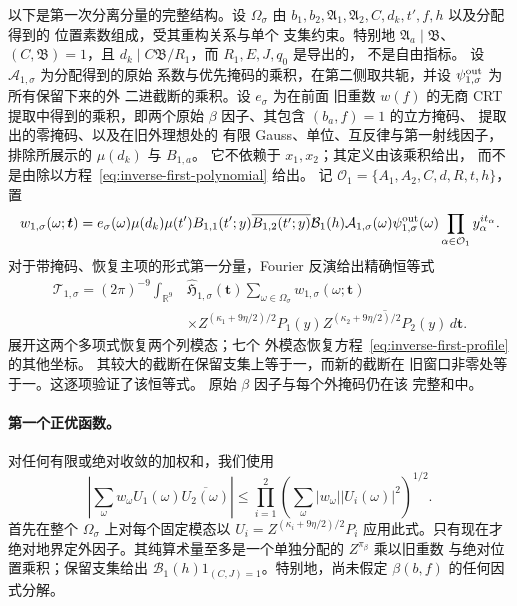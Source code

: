 以下是第一次分离分量的完整结构。设
\(\Omega_\sigma\) 由
\(b_1,b_2,\mathfrak A_1,\mathfrak A_2,C,d_k,t',f,h\) 以及分配得到的
位置素数组成，受其重构关系与单个
支集约束。特别地
\(\mathfrak A_a\mid\mathfrak B\)、\((C,\mathfrak B)=1\)，且
\(d_k\mid C\mathfrak B/R_1\)，而 \(R_1,E,J,q_0\) 是导出的，
不是自由指标。
设 \(\mathcal A_{1,\sigma}\) 为分配得到的原始
系数与优先掩码的乘积，在第二侧取共轭，并设
\(\psi_{1,\sigma}^{\rm out}\) 为所有保留下来的外
二进截断的乘积。设 \(e_\sigma\) 为在前面
旧重数 \(w(f)\) 的无商 CRT 提取中得到的乘积，即两个原始
\(\beta\) 因子、其包含 \((b_a,f)=1\) 的立方掩码、
提取出的零掩码、以及在旧外理想处的
有限 Gauss、单位、互反律与第一射线因子，排除所展示的 \(\mu(d_k)\) 与 \(B_{1,a}\)。
它不依赖于 \(x_1,x_2\)；其定义由该乘积给出，
而不是由除以方程~\eqref{eq:inverse-first-polynomial} 给出。
记 \(\mathcal O_1=\{A_1,A_2,C,d,R,t,h\}\)，置
\[
 w_{1,\sigma}(\omega;\boldsymbol t)
 =e_\sigma(\omega)\mu(d_k)\mu(t')B_{1,1}(t';y)
       \overline{B_{1,2}(t';y)}\mathcal B_1(h)
       \mathcal A_{1,\sigma}(\omega)\psi_{1,\sigma}^{\rm out}(\omega)
       \prod_{\alpha\in\mathcal O_1}y_\alpha^{it_\alpha}.
\]
对于带掩码、恢复主项的形式第一分量，Fourier
反演给出精确恒等式
\begin{equation}\label{eq:inverse-first-separated}
 \begin{split}
 \mathcal T_{1,\sigma}=(2\pi)^{-9}\int_{\mathbb R^9}
 &\widehat{\mathfrak H}_{1,\sigma}(\boldsymbol t)
 \sum_{\omega\in\Omega_\sigma}w_{1,\sigma}(\omega;\boldsymbol t)\\
 &\times Z^{(\kappa_1+9\eta/2)/2}P_1(y)
       \overline{Z^{(\kappa_2+9\eta/2)/2}P_2(y)}\,d\boldsymbol t.
 \end{split}
\end{equation}
展开这两个多项式恢复两个列模态；七个
外模态恢复方程~\eqref{eq:inverse-first-profile} 的其他坐标。
其较大的截断在保留支集上等于一，而新的截断在
旧窗口非零处等于一。这逐项验证了该恒等式。
原始 \(\beta\) 因子与每个外掩码仍在该
完整和中。

\paragraph{第一个正优函数。}
对任何有限或绝对收敛的加权和，我们使用
\begin{equation}\tag{D}\label{eq:weighted-cauchy}
 \left|\sum_\omega w_\omega U_1(\omega)\overline{U_2(\omega)}\right|
 \le\prod_{i=1}^2
       \left(\sum_\omega|w_\omega||U_i(\omega)|^2\right)^{1/2}.
\end{equation}
首先在整个
\(\Omega_\sigma\) 上对每个固定模态以 \(U_i=Z^{(\kappa_i+9\eta/2)/2}P_i\)
应用此式。只有现在才绝对地界定外因子。其纯算术量至多是一个单独分配的 \(Z^{\pi_\beta}\) 乘以旧重数
与绝对位置乘积；保留支集给出
\(\mathcal B_1(h)1_{(C,J)=1}\)。特别地，尚未假定
\(\beta(b,f)\) 的任何因式分解。

